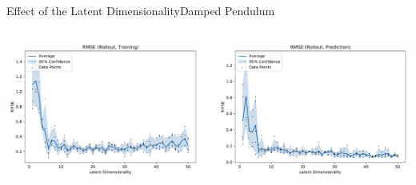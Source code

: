 \documentclass[
	aspectratio=43,
	color={accentcolor=1c},
	logo=false,
	colorframetitle=true,
	handout
]{tudabeamer}
\begin{document}
			\begin{frame}[c]{Effect of the Latent Dimensionality}{Damped Pendulum}
				\begin{columns}[c]
					\begin{column}{0.5\linewidth}
						\begin{center}
							\includegraphics[width=\linewidth]{figures/experiments/pendulum-damped/latent-dim/comparison-rmse-rollout-train-mean-vs-latent-dim.pdf}
						\end{center}
					\end{column}
					\begin{column}{0.5\linewidth}
						\begin{center}
							\includegraphics[width=\linewidth]{figures/experiments/pendulum-damped/latent-dim/comparison-rmse-rollout-prediction-mean-vs-latent-dim.pdf}
						\end{center}
					\end{column}
				\end{columns}
			\end{frame}
\end{document}
